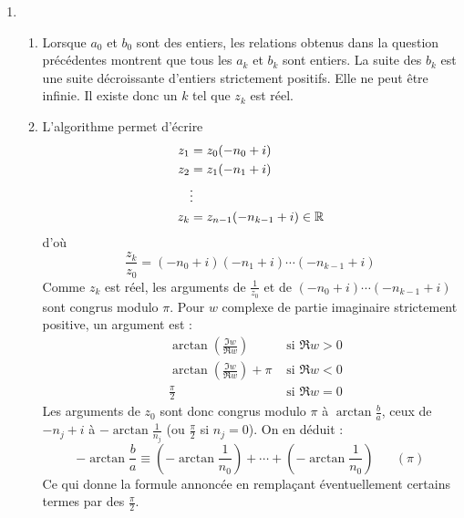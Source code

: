 \begin{enumerate}
\item \begin{enumerate}
 \item Lorsque $a_0$ et $b_0$ sont des entiers, les relations obtenus dans la question précédentes montrent que tous les $a_k$ et $b_k$ sont entiers. La suite des $b_k$ est une suite décroissante d'entiers strictement positifs. Elle ne peut être infinie. Il existe donc un $k$ tel que $z_k$ est réel.
\item L'algorithme permet d'écrire 
\begin{align*}
 z_1 &= z_0(-n_0 + i)\\
z_2 &= z_1(-n_1+i)\\
 &\vdots \\
z_k &= z_{n-1}(-n_{k-1}+i)\in \mathbb{R}
\end{align*}
d'où
\begin{displaymath}
 \frac{z_k}{z_0} = (-n_0 + i)(-n_1 + i)\cdots (-n_{k-1} + i)
\end{displaymath}
Comme $z_k$ est réel, les arguments de $\frac{1}{z_0}$ et de $(-n_0 + i)\cdots (-n_{k-1} + i)$ sont congrus modulo $\pi$.\newline
Pour $w$ complexe de partie imaginaire strictement positive, un argument est :
\begin{align*}
 &\arctan\left( \frac{\Im w}{\Re w}\right)  &\text{ si } \Re w >0 \\
 &\arctan\left( \frac{\Im w}{\Re w}\right) +\pi &\text{ si } \Re w <0 \\
 &\frac{\pi}{2} &\text{ si } \Re w =0
\end{align*}
Les arguments de $z_0$ sont donc congrus modulo $\pi$ à $\arctan \frac{b}{a}$, ceux de $-n_j+i$ à $-\arctan \frac{1}{n_j}$ (ou $\frac{\pi}{2}$ si $n_j=0$). On en déduit :
\begin{displaymath}
 -\arctan \frac{b}{a}\equiv
\left( -\arctan \frac{1}{n_0}\right) + \cdots +\left( -\arctan \frac{1}{n_0}\right) \hspace{20pt} (\pi)
\end{displaymath}
Ce qui donne la formule annoncée en remplaçant éventuellement certains termes par des $\frac{\pi}{2}$.
\end{enumerate}

\end{enumerate}
